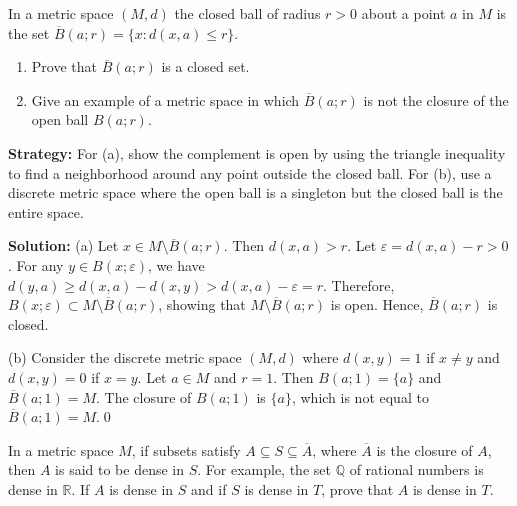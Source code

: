 \begin{problembox}
\begin{problemstatement}
In a metric space \((M, d)\) the closed ball of radius \( r > 0 \) about a point \( a \) in \( M \) is the set \( \overline{B}(a; r) = \{x : d(x, a) \leq r\} \).
\begin{enumerate}[label=\alph*)]
\item Prove that \( \overline{B}(a; r) \) is a closed set.
\item Give an example of a metric space in which \( \overline{B}(a; r) \) is not the closure of the open ball \( B(a; r) \).
\end{enumerate}
\end{problemstatement}
\end{problembox}

\noindent\textbf{Strategy:} For (a), show the complement is open by using the triangle inequality to find a neighborhood around any point outside the closed ball. For (b), use a discrete metric space where the open ball is a singleton but the closed ball is the entire space.

\bigskip\noindent\textbf{Solution:} 
(a) Let $x \in M \setminus \overline{B}(a;r)$. Then $d(x,a) > r$. Let $\varepsilon = d(x,a) - r > 0$. For any $y \in B(x;\varepsilon)$, we have $d(y,a) \geq d(x,a) - d(x,y) > d(x,a) - \varepsilon = r$. Therefore, $B(x;\varepsilon) \subset M \setminus \overline{B}(a;r)$, showing that $M \setminus \overline{B}(a;r)$ is open. Hence, $\overline{B}(a;r)$ is closed.

(b) Consider the discrete metric space $(M,d)$ where $d(x,y) = 1$ if $x \neq y$ and $d(x,y) = 0$ if $x = y$. Let $a \in M$ and $r = 1$. Then $B(a;1) = \{a\}$ and $\overline{B}(a;1) = M$. The closure of $B(a;1)$ is $\{a\}$, which is not equal to $\overline{B}(a;1) = M$.\qed


\begin{problembox}
\begin{problemstatement}
In a metric space \( M \), if subsets satisfy \( A \subseteq S \subseteq \overline{A} \), where \(\overline{A}\) is the closure of \( A \), then \( A \) is said to be dense in \( S \). For example, the set \( \mathbb{Q} \) of rational numbers is dense in \( \mathbb{R} \). If \( A \) is dense in \( S \) and if \( S \) is dense in \( T \), prove that \( A \) is dense in \( T \).
\end{problemstatement}
\end{problembox}

